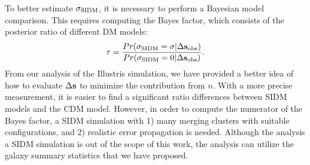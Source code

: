 To better estimate $\sigma_{\rm SIDM}$, it is necessary to perform a Bayesian model 
comparison. This requires computing the Bayes factor, which consists of the
posterior ratio of different DM models:
\begin{equation}
	\tau = \frac{Pr(\sigma_{\rm SIDM} = \sigma| \Delta {\bf s}_{\rm obs})}{Pr(\sigma_{\rm SIDM} = 0|
		\Delta {\bf s}_{\rm obs})}.
\end{equation}
From our analysis of the Illustris simulation, we have provided a better idea of how to evaluate 
$\Delta {\bf s}$ to minimize the contribution from $n$. 
With a more precise measurement, it is easier to find a significant ratio differences
between SIDM models and the CDM model. 
However, in order to compute the numerator of
the Bayes factor, a SIDM simulation with 1) many merging clusters with suitable
configurations, and 2) realistic error propagation is needed.  
Although the analysis a SIDM simulation is out of the scope of this work, 
the analysis can utilize the galaxy summary statistics that we have proposed.  



